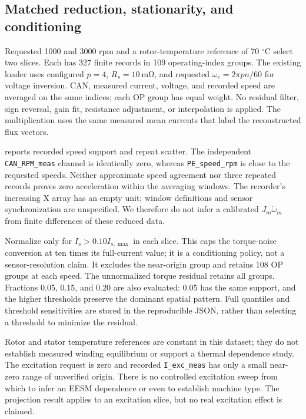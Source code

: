 \subsection{Matched reduction, stationarity, and conditioning}
Requested 1000 and 3000 rpm and a rotor-temperature reference of
70 $^\circ$C select two slices. Each has 327 finite records in 109
operating-index groups. The existing loader uses configured $p=4$,
$R_s=\SI{10}{\milli\ohm}$, and requested
$\omega_e=2\pi pn/60$ for voltage inversion. CAN, measured current,
voltage, and recorded speed are averaged on the same indices;
each OP group has equal weight. No residual filter, sign reversal,
gain fit, resistance adjustment, or interpolation is applied.
The multiplication uses the same measured mean currents that label
the reconstructed flux vectors.

 reports recorded speed support and repeat scatter.
The independent \texttt{CAN\_RPM\_meas} channel is identically zero,
whereas \texttt{PE\_speed\_rpm} is close to the requested speeds.
Neither approximate speed agreement nor three repeated records proves
zero acceleration within the averaging windows. The recorder's increasing
X array has an empty unit; window definitions and sensor synchronization
are unspecified. We therefore do not infer a calibrated $J_m\dot\omega_m$
from finite differences of these reduced data.
\begin{table}[tb]
 \centering\small
 
 \caption{Generated support at the 70-$^\circ$C rotor reference. CAN SD
 is the median sample standard deviation of three records per OP,
 conditionally in Nm; OP speed SD is its analogous median in rpm.
 These are descriptive repeat scatters, not calibrated standard errors.}
 \label{tab:torque-support}
\end{table}

Normalize only for $I_s>0.10 I_{s,\max}$ in each slice. This caps the
torque-noise conversion at ten times its full-current value; it is a
conditioning policy, not a sensor-resolution claim. It excludes the
near-origin group and retains 108 OP groups at each speed.
The unnormalized torque residual retains all groups. Fractions
0.05, 0.15, and 0.20 are also evaluated: 0.05 has the same support,
and the higher thresholds preserve the dominant spatial pattern.
Full quantiles and threshold sensitivities are stored in the reproducible
JSON, rather than selecting a threshold to minimize the residual.

Rotor and stator temperature references are constant in this dataset;
they do not establish measured winding equilibrium or support a thermal
dependence study. The excitation request is zero and recorded
\texttt{I\_exc\_meas} has only a small near-zero range of unverified origin.
There is no controlled excitation sweep from which to infer an EESM
dependence or even to establish machine type. The projection result
applies to an excitation slice, but no real excitation effect is claimed.

